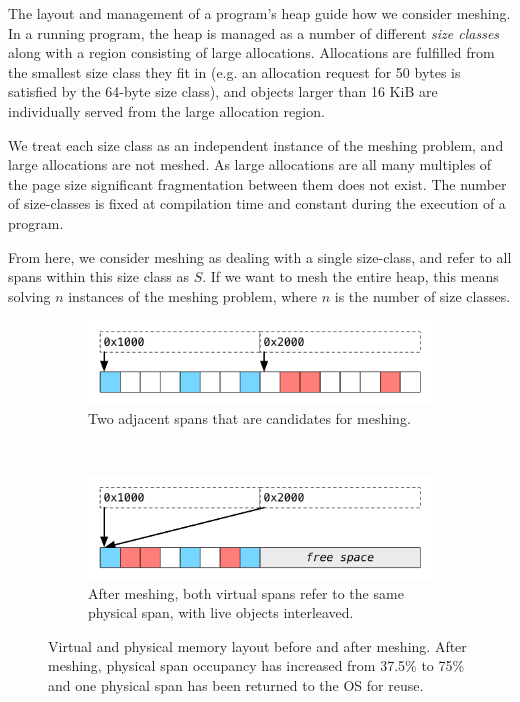 The layout and management of a program's heap guide how we consider
meshing.  In a running program, the heap is managed as a number of
different \textit{size classes} along with a region consisting of
large allocations.  Allocations are fulfilled from the smallest size
class they fit in (e.g. an allocation request for 50 bytes is
satisfied by the 64-byte size class), and objects larger than 16 KiB
are individually served from the large allocation region.

We treat each size class as an independent instance of the meshing
problem, and large allocations are not meshed.  As large allocations
are all many multiples of the page size significant fragmentation
between them does not exist.  The number of size-classes is fixed at
compilation time and constant during the execution of a program.

From here, we consider meshing as dealing with a single size-class,
and refer to all spans within this size class as $S$.  If we want to
mesh the entire heap, this means solving $n$ instances of the meshing
problem, where $n$ is the number of size classes.


\begin{figure}[!t]
  \centering
  \begin{subfigure}[t]{.5\textwidth}
    \centering
    \includegraphics[width=\textwidth]{figures/before_meshing}
    \caption{Two adjacent spans that are candidates for meshing.}
  \end{subfigure}%
  ~

  \begin{subfigure}[t]{.5\textwidth}
    \centering
    \includegraphics[width=\textwidth]{figures/after_meshing}
    \caption{After meshing, both virtual spans refer to the same
      physical \newline span, with live objects interleaved.}
  \end{subfigure}
  \caption{Virtual and physical memory layout before and after
    meshing.  After meshing, physical span occupancy has increased
    from 37.5\% to 75\% and one physical span has been returned to the
    OS for reuse.}
  \label{fig:meshing}
\end{figure}

